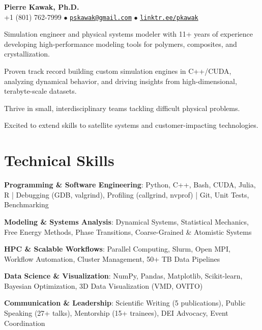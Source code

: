 
\begin{center}
  {\LARGE \textbf{Pierre Kawak, Ph.D.} }\\[1ex]
  +1 (801) 762-7999 $\bullet$ \href{mailto:pskawak@gmail.com}{\tt pskawak@gmail.com} $\bullet$ \href{https://linktr.ee/pkawak}{\tt linktr.ee/pkawak}\\
\end{center}
\begin{tabitemize}
  \item Simulation engineer and physical systems modeler with 11+ years of experience developing high-performance modeling tools for polymers, composites, and crystallization.
  \item Proven track record building custom simulation engines in C++/CUDA, analyzing dynamical behavior, and driving insights from high-dimensional, terabyte-scale datasets.
  \item Thrive in small, interdisciplinary teams tackling difficult physical problems.
  \item Excited to extend skills to satellite systems and customer-impacting technologies.
\end{tabitemize}
\vspace{-1.4\baselineskip}
\section*{Technical Skills}
\begin{tabitemize}
  \item \textbf{Programming \& Software Engineering}: Python, C++, Bash, CUDA, Julia, R | Debugging (GDB, valgrind), Profiling (callgrind, nvprof) | Git, Unit Tests, Benchmarking
  \item \textbf{Modeling \& Systems Analysis}: Dynamical Systems, Statistical Mechanics, Free Energy Methods, Phase Transitions, Coarse-Grained \& Atomistic Systems
  \item \textbf{HPC \& Scalable Workflows}: Parallel Computing, Slurm, Open MPI, Workflow Automation, Cluster Management, 50+ TB Data Pipelines
  \item \textbf{Data Science \& Visualization}: NumPy, Pandas, Matplotlib, Scikit-learn, Bayesian Optimization, 3D Data Visualization (VMD, OVITO)
  \item \textbf{Communication \& Leadership}: Scientific Writing (5 publications), Public Speaking (27+ talks), Mentorship (15+ trainees), DEI Advocacy, Event Coordination
\end{tabitemize}
\vspace{-1.2\baselineskip}
